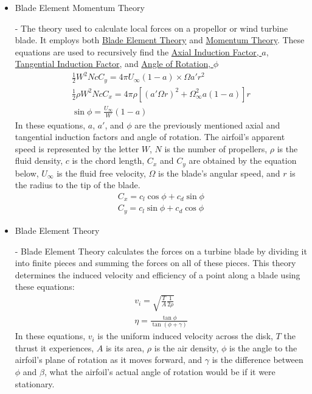 \documentclass{article}
\begin{document}
\begin{itemize}
	\item \hypertarget{BEM}{Blade Element Momentum Theory} - The theory used to calculate local forces on a propellor or wind turbine blade. It employs both \hyperlink{BET}{Blade Element Theory} and \hyperlink{MT}{Momentum Theory}. These equations are used to recursively find the \hyperlink{a}{Axial Induction Factor, $a$}, \hyperlink{a'}{Tangential Induction Factor}, and \hyperlink{phi}{Angle of Rotation, $\phi$}
	\begin{equation}
	\begin{aligned}
		\frac{1}{2} W^{2} N c C_{y} = 4 \pi U_{\infty} (1 - a) \times \Omega a' r^{2} \\
		\frac{1}{2} \rho W^{2} N c C_{x} = 4 \pi \rho [(a' \Omega r)^{2} + \Omega^{2}_{\infty} a (1 - a)] r \\
		\sin \phi = \frac{U_{\infty}}{W} (1 - a)
	\end{aligned}
	\end{equation}
In these equations, $a$, $a'$, and $\phi$ are the previously mentioned axial and tangential induction factors and angle of rotation. The airfoil's apparent speed is represented by the letter $W$, $N$ is the number of propellers, $\rho$ is the fluid density, $c$ is the chord length, $C_{x}$ and $C_{y}$ are obtained by the equation below, $U_{\infty}$ is the fluid free velocity, $\Omega$ is the blade's angular speed, and $r$ is the radius to the tip of the blade.
	\begin{equation}
	\begin{aligned}
		C_{x} = c_{l} \cos{\phi} + c_{d} \sin{\phi} \\
		C_{y} = c_{l} \sin{\phi} + c_{d} \cos{\phi}
	\end{aligned}
	\end{equation}
	
	\item \hypertarget{BET}{Blade Element Theory} - Blade Element Theory calculates the forces on a turbine blade by dividing it into finite pieces and summing the forces on all of these pieces. This theory determines the induced velocity and efficiency of a point along a blade using these equations:
	\begin{equation}
	\begin{aligned}
		v_{i} = \sqrt{\frac{T}{A} \frac{1}{2 \rho}} \\
        		\eta = \frac{\tan{\phi}}{\tan{(\phi + \gamma)}}
	\end{aligned}
	\end{equation}
In these equations, $v_{i}$ is the uniform induced velocity across the disk, $T$ the thrust it experiences, $A$ is its area, $\rho$ is the air density, $\phi$ is the angle to the airfoil's plane of rotation as it moves forward, and $\gamma$ is the difference between $\phi$ and $\beta$, what the airfoil's actual angle of rotation would be if it were stationary.
	

\end{itemize}
\end{document}
